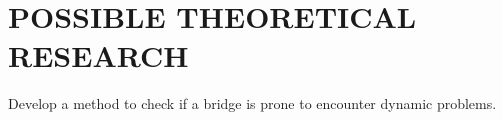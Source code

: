 
\chapter{POSSIBLE THEORETICAL RESEARCH}

Develop a method to check if a bridge is prone to encounter dynamic problems.